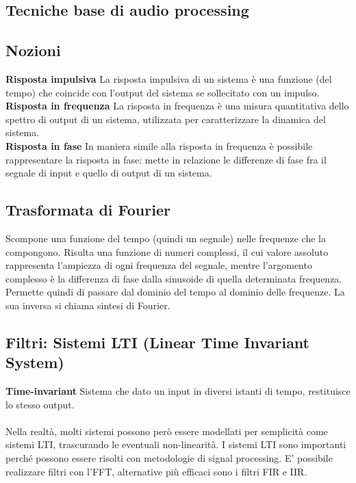 \documentclass[8pt,a4paper]{article}
\begin{document}
\begin{multicols}{5}
    \section{Tecniche base di audio processing}
    \subsection{Nozioni}
    \textbf{Risposta impulsiva} La risposta impulsiva di un sistema è una funzione 
    (del tempo) che coincide con l’output del sistema se sollecitato con un impulso. \\
    \textbf{Risposta in frequenza} La risposta in frequenza è una misura quantitativa 
    dello spettro di output di un sistema, utilizzata per caratterizzare la dinamica 
    del sistema. \\
    \textbf{Risposta in fase} In maniera simile alla risposta in frequenza è possibile 
    rappresentare la risposta in fase: mette in relazione le differenze di fase fra il 
    segnale di input e quello di output di un sistema.

    \subsection{Trasformata di Fourier}
    Scompone una funzione del tempo (quindi un segnale) nelle frequenze che la
    compongono. Risulta una funzione di numeri complessi, il cui valore assoluto
    rappresenta l'ampiezza di ogni frequenza del segnale, mentre l'argomento
    complesso è la differenza di fase dalla sinusoide di quella determinata frequenza.\\
    Permette quindi di passare dal dominio del tempo al dominio delle frequenze.
    La sua inversa si chiama sintesi di Fourier.

    \subsection{Filtri: Sistemi LTI (Linear Time Invariant System)}
    \textbf{Time-invariant} Sistema che dato un input in diversi istanti di tempo, 
    restituisce lo stesso output. \\ \\ 
    Nella realtà, molti sistemi possono però essere modellati per semplicità come 
    sistemi LTI, trascurando le eventuali non-linearità. I sistemi LTI sono importanti 
    perché possono essere risolti con metodologie di signal processing. E’ possibile 
    realizzare filtri con l’FFT, alternative più efficaci sono i filtri FIR e IIR.



\end{multicols}
\end{document}
